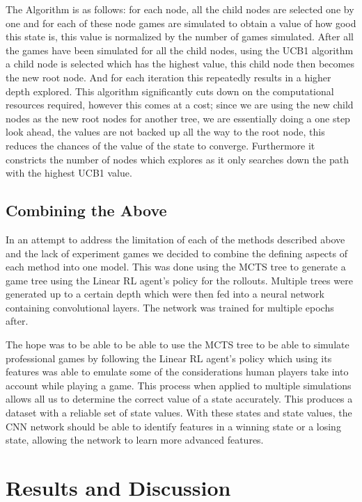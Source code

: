 \documentclass[a4paper,12pt,table]{article}
\begin{document}
The Algorithm is as follows: for each node, all the child nodes are selected one by one and for each of these node games are simulated to obtain a value of how good this state is, this value is normalized by the number of games simulated. After all the games have been simulated for all the child nodes, using the UCB1 algorithm a child node is selected which has the highest value, this child node then becomes the new root node. And for each iteration this repeatedly results in a higher depth explored. This algorithm significantly cuts down on the computational resources required, however this comes at a cost; since we are using the new child nodes as the new root nodes for another tree, we are essentially doing a one step look ahead, the values are not backed up all the way to the root node, this reduces the chances of the value of the state to converge. Furthermore it constricts the number of nodes which explores as it only searches down the path with the highest UCB1 value. \par


\subsection{Combining the Above}

In an attempt to address the limitation of each of the methods described above and the lack of experiment games we decided to combine the defining aspects of each method into one model. This was done using the MCTS tree to generate a game tree using the Linear RL agent’s policy for the rollouts. Multiple trees were generated up to a certain depth which were then fed into a neural network containing convolutional layers. The network was trained for multiple epochs after. \par

The hope was to be able to be able to use the MCTS tree to be able to simulate professional games by following the Linear RL agent’s policy which using its features was able to emulate some of the considerations human players take into account while playing a game. This process when applied to multiple simulations allows all us to determine the correct value of a state accurately. This produces a dataset with a reliable set of state values. With these states and state values, the CNN network should be able to identify features in a winning state or a losing state, allowing the network to learn more advanced features. \par

\section{Results and Discussion}
\end{document}
